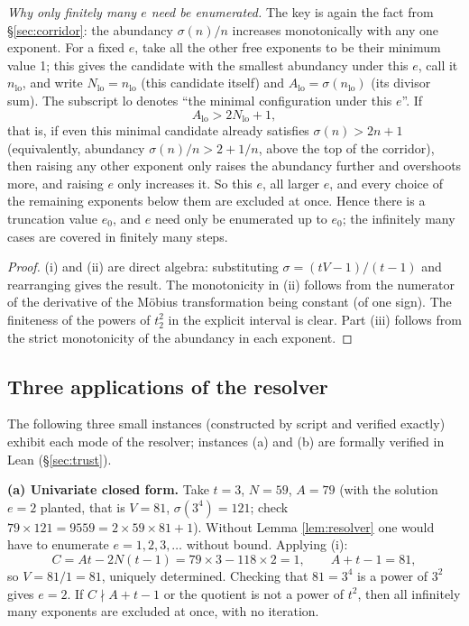 \documentclass[11pt]{article}
\theoremstyle{remark}
\begin{document}
\emph{Why only finitely many $e$ need be enumerated.} The key is again the fact from \S\ref{sec:corridor}: the abundancy $\sigma(n)/n$ increases monotonically with any one exponent. For a fixed $e$, take all the other free exponents to be their minimum value 1; this gives the candidate with the smallest abundancy under this $e$, call it $n_{\mathrm{lo}}$, and write $N_{\mathrm{lo}} = n_{\mathrm{lo}}$ (this candidate itself) and $A_{\mathrm{lo}} = \sigma(n_{\mathrm{lo}})$ (its divisor sum). The subscript lo denotes ``the minimal configuration under this $e$''. If
\[ A_{\mathrm{lo}} > 2 N_{\mathrm{lo}} + 1,
\] that is, if even this minimal candidate already satisfies $\sigma(n) > 2n + 1$ (equivalently, abundancy $\sigma(n)/n > 2 + 1/n$, above the top of the corridor), then raising any other exponent only raises the abundancy further and overshoots more, and raising $e$ only increases it. So this $e$, all larger $e$, and every choice of the remaining exponents below them are excluded at once. Hence there is a truncation value $e_0$, and $e$ need only be enumerated up to $e_0$; the infinitely many cases are covered in finitely many steps.

\begin{proof} (i) and (ii) are direct algebra: substituting $\sigma = (tV - 1)/(t - 1)$ and rearranging gives the result. The monotonicity in (ii) follows from the numerator of the derivative of the M\"obius transformation being constant (of one sign). The finiteness of the powers of $t_2^2$ in the explicit interval is clear. Part (iii) follows from the strict monotonicity of the abundancy in each exponent.
\end{proof}

\subsection{Three applications of the resolver}\label{sec:lem3apps}

The following three small instances (constructed by script and verified exactly) exhibit each mode of the resolver; instances (a) and (b) are formally verified in Lean (\S\ref{sec:trust}).

\textbf{(a) Univariate closed form.} Take $t = 3$, $N = 59$, $A = 79$ (with the solution $e = 2$ planted, that is $V = 81$, $\sigma(3^4) = 121$; check $79 \times 121 = 9559 = 2 \times 59 \times 81 + 1$). Without Lemma \ref{lem:resolver} one would have to enumerate $e = 1, 2, 3, \dots$ without bound. Applying (i):
\[ C = At - 2N(t - 1) = 79 \times 3 - 118 \times 2 = 1, \qquad A + t - 1 = 81,
\] so $V = 81/1 = 81$, uniquely determined. Checking that $81 = 3^4$ is a power of $3^2$ gives $e = 2$. If $C \nmid A + t - 1$ or the quotient is not a power of $t^2$, then all infinitely many exponents are excluded at once, with no iteration.
\end{document}
